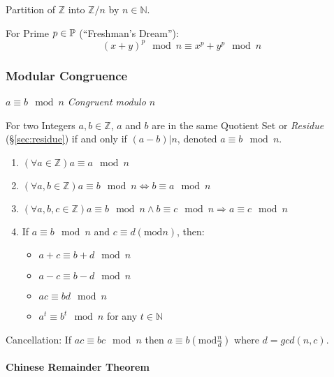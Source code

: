 Partition of $\mathbb{Z}$ into $\mathbb{Z}/n$ by $n \in \mathbb{N}$.

For Prime $p \in \mathbb{P}$ (``Freshman's Dream''):
\[
  (x+y)^p \mod n \equiv x^p + y^p \mod n
\]



\subsubsection{Modular Congruence}\label{sec:modular_congruence}

$a \equiv b \mod n$ \emph{Congruent modulo $n$}

For two Integers $a,b \in \mathbb{Z}$, $a$ and $b$ are in the same
Quotient Set or \emph{Residue} (\S\ref{sec:residue}) if and only if
$(a - b)|n$, denoted $a \equiv b \mod n$.

\begin{enumerate}

  \item $(\forall a \in \mathbb{Z}) a \equiv a \mod n$

  \item $(\forall a,b \in \mathbb{Z}) a \equiv b \mod n
    \Leftrightarrow b \equiv a \mod n$

  \item $(\forall a,b,c \in \mathbb{Z}) a \equiv b \mod n
    \wedge b \equiv c \mod n \Rightarrow a \equiv c
    \mod n$

  \item
    If $a \equiv b \mod n$ and $c \equiv d (\mathrm{mod }
    n)$, then:
    \begin{itemize}
    \item $a + c \equiv b + d \mod n$
    \item $a - c \equiv b - d \mod n$
    \item $ac \equiv bd \mod n$
    \item $a^t \equiv b ^t \mod n$ for any $t \in
      \mathbb{N}$
    \end{itemize}

\end{enumerate}

Cancellation: If $ac \equiv bc \mod n$ then $a \equiv b
(\mathrm{mod } \frac{n}{d})$ where $d = gcd(n,c)$.



\paragraph{Chinese Remainder Theorem}\label{sec:chinese_remainder}\hfill

